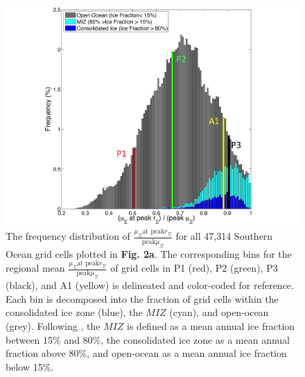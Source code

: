 \begin{figure}[!htbp]
\begin{adjustwidth}{-1in}{-1in}
 \centering
 \includegraphics[scale=.2]{figures/Ch2/Figure_8.jpg}
\end{adjustwidth}
\caption[The frequency distribution of $\frac{\mu_\Sigma \textrm{at peak} r_\Sigma}{\textrm{peak} \mu_\Sigma}$]{The frequency distribution of $\frac{\mu_\Sigma \textrm{at peak} r_\Sigma}{\textrm{peak} \mu_\Sigma}$ for all 47,314 Southern Ocean grid cells plotted in \textbf{Fig. 2a}. The corresponding bins for the regional mean $\frac{\mu_\Sigma \textrm{at peak} r_\Sigma}{\textrm{peak} \mu_\Sigma}$ of grid cells in P1 (red), P2 (green), P3 (black), and A1 (yellow) is delineated and color-coded for reference. Each bin is decomposed into the fraction of grid cells within the consolidated ice zone (blue), the $MIZ$ (cyan), and open-ocean (grey). Following \parencite{StroeveMappingassessingvariability2016}, the $MIZ$ is defined as a mean annual ice fraction between 15\% and 80\%, the consolidated ice zone as a mean annual fraction above 80\%, and open-ocean as a mean annual ice fraction below 15\%. }
\label{fig:Fig8}
\end{figure}




